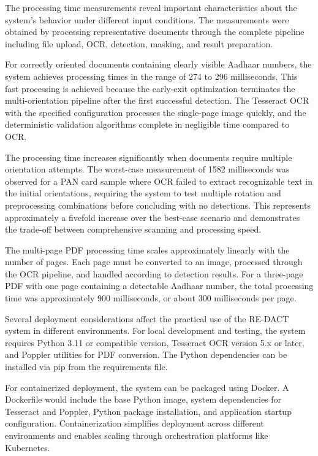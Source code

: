 \bigskip

The processing time measurements reveal important characteristics about the system's behavior under different input conditions. The measurements were obtained by processing representative documents through the complete pipeline including file upload, OCR, detection, masking, and result preparation.

For correctly oriented documents containing clearly visible Aadhaar numbers, the system achieves processing times in the range of 274 to 296 milliseconds. This fast processing is achieved because the early-exit optimization terminates the multi-orientation pipeline after the first successful detection. The Tesseract OCR with the specified configuration processes the single-page image quickly, and the deterministic validation algorithms complete in negligible time compared to OCR.

The processing time increases significantly when documents require multiple orientation attempts. The worst-case measurement of 1582 milliseconds was observed for a PAN card sample where OCR failed to extract recognizable text in the initial orientations, requiring the system to test multiple rotation and preprocessing combinations before concluding with no detections. This represents approximately a fivefold increase over the best-case scenario and demonstrates the trade-off between comprehensive scanning and processing speed.

The multi-page PDF processing time scales approximately linearly with the number of pages. Each page must be converted to an image, processed through the OCR pipeline, and handled according to detection results. For a three-page PDF with one page containing a detectable Aadhaar number, the total processing time was approximately 900 milliseconds, or about 300 milliseconds per page.

\bigskip

Several deployment considerations affect the practical use of the RE-DACT system in different environments. For local development and testing, the system requires Python 3.11 or compatible version, Tesseract OCR version 5.x or later, and Poppler utilities for PDF conversion. The Python dependencies can be installed via pip from the requirements file.

For containerized deployment, the system can be packaged using Docker. A Dockerfile would include the base Python image, system dependencies for Tesseract and Poppler, Python package installation, and application startup configuration. Containerization simplifies deployment across different environments and enables scaling through orchestration platforms like Kubernetes.

